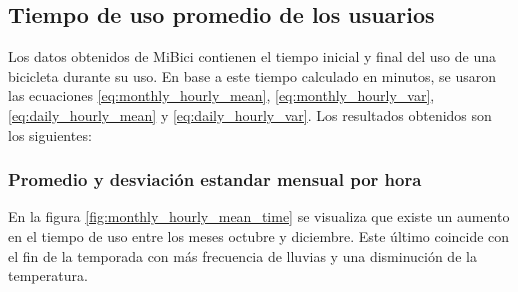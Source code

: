 \subsection{Tiempo de uso promedio de los usuarios}

Los datos obtenidos de MiBici contienen el tiempo inicial y final del uso de una bicicleta durante su uso. En base a este tiempo calculado en minutos, se usaron las ecuaciones \ref{eq:monthly_hourly_mean}, \ref{eq:monthly_hourly_var}, \ref{eq:daily_hourly_mean} y \ref{eq:daily_hourly_var}. Los resultados obtenidos son los siguientes:

\subsubsection{Promedio y desviación estandar mensual por hora}

En la figura \ref{fig:monthly_hourly_mean_time} se visualiza que existe un aumento en el tiempo de uso entre los meses octubre y diciembre. Este último coincide con el fin de la temporada con más frecuencia de lluvias y una disminución de la temperatura\cite{clima_guadalajara}.

